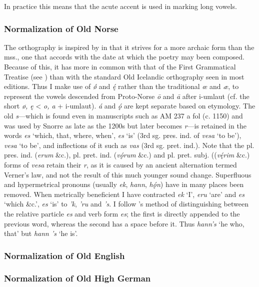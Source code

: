     In practice this means that the acute accent is used in marking long vowels. %

    \subsubsection{Normalization of Old Norse}
    The orthography is inspired by \textcite{FinnurEdda} in that it strives for a more archaic form than the mss., one that accords with the date at which the poetry may been composed. Because of this, it has more in common with that of the First Grammatical Treatise (see \parencite{FGTHaugen}) than with the standard Old Icelandic orthography seen in most editions. Thus I make use of \emph{ǿ} and \emph{ę́} rather than the traditional \emph{œ} and \emph{æ}, to represent the vowels descended from Proto-Norse \emph{ō} and \emph{ā} after i-umlaut (cf. the short \emph{ø, ę} < \emph{o, a} + i-umlaut).
    \emph{á} and \emph{ǫ́} are kept separate based on etymology.
    The old \emph{s}—which is found even in manuscripts such as AM 237 a fol (c. 1150) and was used by Snorre as late as the 1200s but later becomes \emph{r}—is retained in the words \emph{es} ‘which, that, where, when’, \emph{es} ‘is’ (3rd sg. pres. ind. of \emph{vesa} ‘to be’), \emph{vesa} ‘to be’, and inflections of it such as \emph{vas} (3rd sg. pret. ind.). Note that the pl. pres. ind. (\emph{erum} \&c.), pl. pret. ind. (\emph{vǫ́rum} \&c.) and pl. pret. subj. ((\emph{vę́rim} \&c.) forms of \emph{vesa} retain their \emph{r}, as it is caused by an ancient alternation termed Verner’s law, and not the result of this much younger sound change.
    Superfluous and hypermetrical pronouns (usually \emph{ek}, \emph{hann}, \emph{hǫ́n}) have in many places been removed.
    When metrically beneficient I have contracted \emph{ek} ‘I’, \emph{eru} ‘are’ and \emph{es} ‘which \&c.’, \emph{es} ‘is’ to \emph{’k}, \emph{’ru} and \emph{’s}. I follow \textcite{FinnurEdda}’s method of distinguishing between the relative particle \emph{es} and verb form \emph{es}; the first is directly appended to the previous word, whereas the second has a space before it. Thus \emph{hann’s} ‘he who, that’ but \emph{hann ’s} ‘he is’.

    \subsubsection{Normalization of Old English}

    \subsubsection{Normalization of Old High German}

